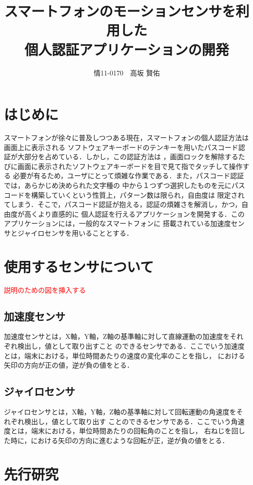 \documentclass[11pt]{jreport}
\title{\bfseries スマートフォンのモーションセンサを利用した\\個人認証アプリケーションの開発}
\author{情11-0170　高坂 賢佑}
\date{}
\begin{document}
\maketitle

\tableofcontents
\listoffigures

\chapter*{はじめに}
スマートフォンが徐々に普及しつつある現在，スマートフォンの個人認証方法は画面上に表示される
ソフトウェアキーボードのテンキーを用いたパスコード認証が大部分を占めている．しかし，この認証方法は
，画面ロックを解除するたびに画面に表示されたソフトウェアキーボードを目で見て指でタッチして操作する
必要が有るため，ユーザにとって煩雑な作業である．また，パスコード認証では，あらかじめ決められた文字種の
中から１つずつ選択したものを元にパスコードを構築していくという性質上，パターン数は限られ，自由度は
限定されてしまう．そこで，パスコード認証が抱える，認証の煩雑さを解消し，かつ，自由度が高くより直感的に
個人認証を行えるアプリケーションを開発する．このアプリケーションには，一般的なスマートフォンに
搭載されている加速度センサとジャイロセンサを用いることとする．

\chapter{使用するセンサについて}
    \textcolor{red}{説明のための図を挿入する}

	\section{加速度センサ}
	加速度センサとは，X軸，Y軸，Z軸の基準軸に対して直線運動の加速度をそれぞれ検出し，値として取り出すこと
	のできるセンサである．ここでいう加速度とは，端末における，単位時間あたりの速度の変化率のことを指し，
	における矢印の方向が正の値，逆が負の値をとる．
	
	\section{ジャイロセンサ}
	ジャイロセンサとは，X軸，Y軸，Z軸の基準軸に対して回転運動の角速度をそれぞれ検出し，値として取り出す
	ことのできるセンサである．ここでいう角速度とは，端末における，単位時間あたりの回転角のことを指し，
	右ねじを回した時に，における矢印の方向に進むような回転が正，逆が負の値をとる．

\chapter{先行研究}
\end{document}
